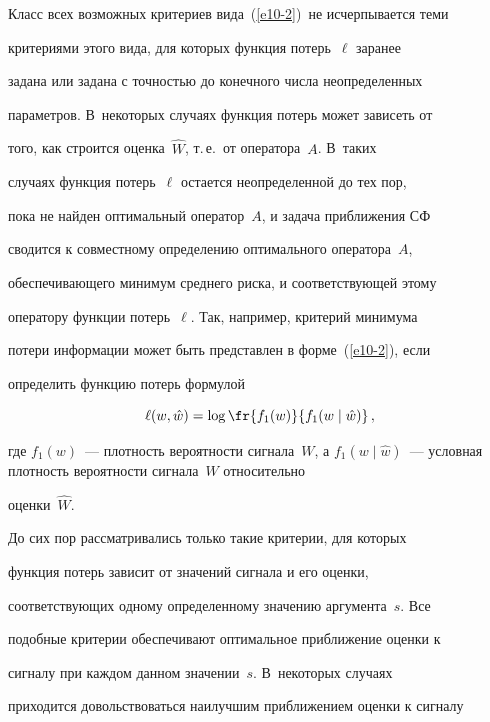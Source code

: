 Класс всех возможных критериев вида~(\ref{e10-2})\ не исчерпывается теми


 критериями этого вида, для которых функция потерь~$\ell$ заранее


 задана или задана с точ\-ностью до конечного числа неопределенных


 параметров. В~некоторых случаях функция потерь может  зависеть от


 того, как строится оценка~$\hat W$, т.\,е.\ от оператора~$A$. В~таких


 случаях функция потерь~$\ell$ остается неопределенной до тех пор,


 пока не найден оптимальный оператор~$A$, и задача приближения СФ


 сводится к совместному определению оптимального оператора~$A$,


 обеспечивающего минимум среднего риска, и соответствующей этому


 оператору функции потерь~$\ell$. Так, например, критерий минимума


 потери информации может быть представлен в форме~(\ref{e10-2}), если


 определить функцию потерь формулой


 \begin{equation}


\ell (w,\hat w) =\log \fr{f_1(w)}{f_1 (w\mid \hat w)}\,,


\label{e27-2}


\end{equation}


где $f_1(w)$~--- плотность вероятности сигнала~$W$, а  $f_1(w\mid


\hat w)$~--- услов\-ная плот\-ность вероятности сигнала~$W$ относительно


оцен\-ки~$\hat W$.





До сих пор рассматривались только такие критерии, для которых


функция потерь зависит от значений сигнала и его оценки,


соответствующих одному определенному значению аргумента~$s$. Все


подобные критерии обеспечивают оптимальное приближение оценки к


сигналу при каждом данном значении~$s$. В~некоторых случаях


приходится довольствоваться наилучшим приближением оценки к сигналу


